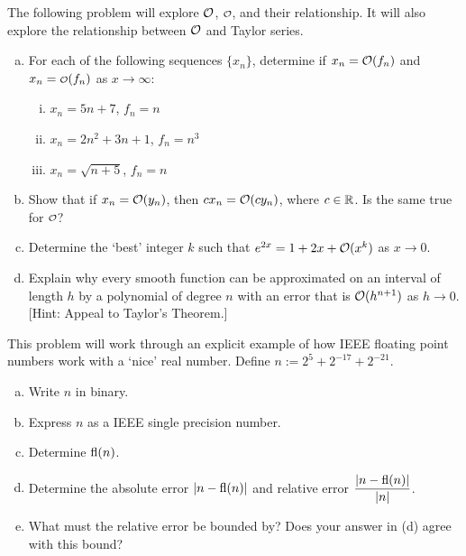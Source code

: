\documentclass[11pt,letterpaper]{article}
\begin{document}

 The following problem will explore $\mathcal{O}$, $\smallO$, and their relationship. It will also explore the relationship between $\mathcal{O}$ and Taylor series. 
	\begin{enumerate}[(a)]
	\item For each of the following sequences $\{ x_n \}$, determine if $x_n= \mathcal{O}(f_n)$ and $x_n = \smallO(f_n)$ as $x \to \infty$:
		\begin{enumerate}[(i)]
		\item $x_n= 5n + 7$, $f_n= n$
		\item $x_n= 2n^2 + 3n + 1$, $f_n= n^3$
		\item $x_n= \sqrt{n + 5}$, $f_n= n$
		\end{enumerate}
	\item Show that if $x_n= \mathcal{O}(y_n)$, then $cx_n= \mathcal{O}(cy_n)$, where $c \in \mathbb{R}$. Is the same true for $\smallO$?
	\item Determine the `best' integer $k$ such that $e^{2x}= 1 + 2x + \mathcal{O}(x^k)$ as $x \to 0$. 
	\item Explain why every smooth function can be approximated on an interval of length $h$ by a polynomial of degree $n$ with an error that is $\mathcal{O}(h^{n+1})$ as $h \to 0$. [Hint: Appeal to Taylor's Theorem.]
	\end{enumerate}



\newpage



 This problem will work through an explicit example of how IEEE floating point numbers work with a `nice' real number. Define $n:= 2^5 + 2^{-17} + 2^{-21}$.
	\begin{enumerate}[(a)]
	\item Write $n$ in binary. 
	\item Express $n$ as a IEEE single precision number.
	\item Determine $\operatorname{fl}(n)$. 
	\item Determine the absolute error $|n - \operatorname{fl}(n)|$ and relative error $\dfrac{|n - \operatorname{fl}(n)|}{|n|}$. 
	\item What must the relative error be bounded by? Does your answer in (d) agree with this bound?
	\end{enumerate}
\end{document}
